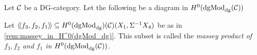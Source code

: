 \begin{definition}
    \label{def:massey_product_H^0(dgMod_dg(C))}
    Let \( {\mathcal{C}} \) be a DG-category. Let the following be a diagram in \( H^0(\operatorname{dgMod}_{\operatorname{dg}}({\mathcal{C}})) \)
    \begin{center}
    \end{center}
    Let \( \langle \! \langle f_3, f_2, f_1\rangle \! \rangle \subseteq H^0(\operatorname{dgMod}_{\operatorname{dg}})({\mathcal{C}})(X_1, \Sigma^{-1}X_4) \) be as in \autoref{rem:massey_in_H^0(dgMod_dg)}. This subset is called the \emph{massey product of \( f_3, f_2 \) and \( f_1 \) in \( H^0(\operatorname{dgMod}_{\operatorname{dg}}({\mathcal{C}})) \)}.
\end{definition}

